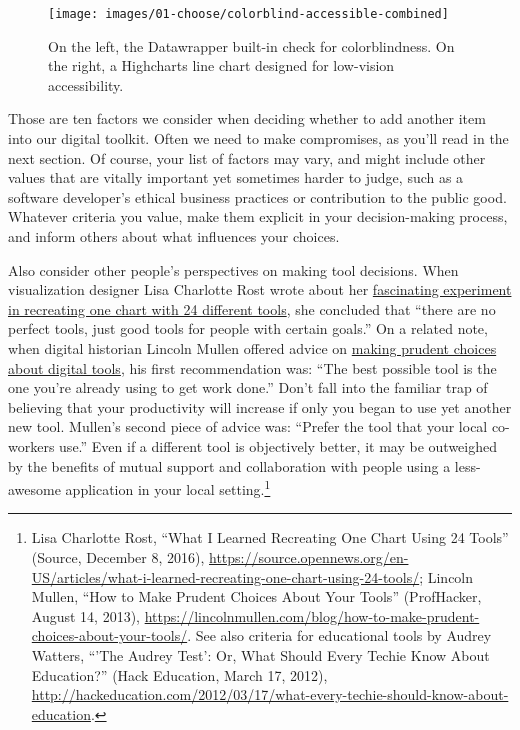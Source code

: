 \documentclass[
  english,
]{book}
\begin{document}
\begin{figure}
\texttt{[image: images/01-choose/colorblind-accessible-combined]} \caption{On the left, the Datawrapper built-in check for colorblindness. On the right, a Highcharts line chart designed for low-vision accessibility.}\label{fig:colorblind-accessible-combined}
\end{figure}

Those are ten factors we consider when deciding whether to add another item into our digital toolkit. Often we need to make compromises, as you'll read in the next section. Of course, your list of factors may vary, and might include other values that are vitally important yet sometimes harder to judge, such as a software developer's ethical business practices or contribution to the public good. Whatever criteria you value, make them explicit in your decision-making process, and inform others about what influences your choices.

Also consider other people's perspectives on making tool decisions. When visualization designer Lisa Charlotte Rost wrote about her \href{https://source.opennews.org/articles/what-i-learned-recreating-one-chart-using-24-tools/}{fascinating experiment in recreating one chart with 24 different tools}, she concluded that ``there are no perfect tools, just good tools for people with certain goals.'' On a related note, when digital historian Lincoln Mullen offered advice on \href{https://lincolnmullen.com/blog/how-to-make-prudent-choices-about-your-tools/}{making prudent choices about digital tools}, his first recommendation was: ``The best possible tool is the one you're already using to get work done.'' Don't fall into the familiar trap of believing that your productivity will increase if only you began to use yet another new tool. Mullen's second piece of advice was: ``Prefer the tool that your local co-workers use.'' Even if a different tool is objectively better, it may be outweighed by the benefits of mutual support and collaboration with people using a less-awesome application in your local setting.\footnote{Lisa Charlotte Rost, {``What {I Learned Recreating One Chart Using} 24 {Tools}''} ({Source}, December 8, 2016), \url{https://source.opennews.org/en-US/articles/what-i-learned-recreating-one-chart-using-24-tools/}; Lincoln Mullen, {``How to {Make Prudent Choices About Your Tools}''} ({ProfHacker}, August 14, 2013), \url{https://lincolnmullen.com/blog/how-to-make-prudent-choices-about-your-tools/}. See also criteria for educational tools by Audrey Watters, {``'{The Audrey Test}': {Or}, {What Should Every Techie Know About Education}?''} ({Hack Education}, March 17, 2012), \url{http://hackeducation.com/2012/03/17/what-every-techie-should-know-about-education}.}
\end{document}
